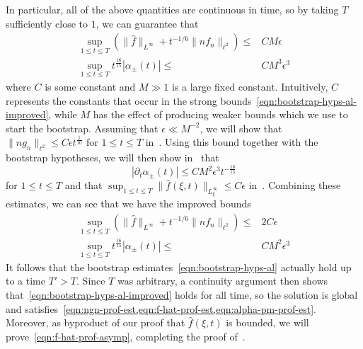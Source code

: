 \documentclass[letterpaper, reqno,final]{amsart}
\begin{document}
In particular, all of the above quantities are continuous in time, so by taking $T$ sufficiently close to $1$, we can guarantee that
\begin{equation}\label{eqn:bootstrap-hyps-al}\begin{split}
    \sup_{1 \leq t \leq T} \left( \lVert \hat{f} \rVert_{L^\infty} + t^{-1/6} \lVert n f_n \rVert_{\ell^2} \right) \leq& CM\epsilon\\
    \sup_{1 \leq t \leq T} t^{\frac{16}{15}}|\alpha_{\pm}(t)| \leq& CM^3 \epsilon^3 
\end{split}
\end{equation}
where $C$ is some constant and $M \gg 1$ is a large fixed constant.  Intuitively, $C$ represents the constants that occur in the strong bounds~\eqref{eqn:bootstrap-hyps-al-improved}, while $M$ has the effect of producing weaker bounds which we use to start the bootstrap.  Assuming that $\epsilon \ll M^{-2}$, we will show that $\lVert n g_n \rVert_{\ell^2} \leq C \epsilon t^{\frac{1}{10}}$ for $1 \leq t \leq T$ in~.  Using this bound together with the bootstrap hypotheses, we will then show in~ that
\begin{equation*}
    |\partial_t \alpha_\pm(t)| \leq CM^2 \epsilon^3 t^{-\frac{16}{15}}
\end{equation*}
for $1 \leq t \leq T$ and that $\sup_{1 \leq t \leq T}\lVert \hat{f}(\xi,t) \rVert_{L^\infty_\xi} \leq C\epsilon$ in~.  Combining these estimates, we can see that we have the improved bounds
\begin{equation}\label{eqn:bootstrap-hyps-al-improved}\begin{split}
    \sup_{1 \leq t \leq T} \left( \lVert \hat{f} \rVert_{L^\infty} + t^{-1/6} \lVert n f_n \rVert_{\ell^2} \right) \leq& 2C\epsilon\\
    \sup_{1 \leq t \leq T} t^{\frac{16}{15}} |\alpha_{\pm}(t)| \leq& CM^2 \epsilon^3 
\end{split}
\end{equation}
It follows that the bootstrap estimates~\eqref{eqn:bootstrap-hyps-al} actually hold up to a time $T' > T$.  Since $T$ was arbitrary, a continuity argument then shows that~\eqref{eqn:bootstrap-hyps-al-improved} holds for all time, so the solution is global and satisfies~\cref{eqn:ngn-prof-est,eqn:f-hat-prof-est,eqn:alpha-pm-prof-est}.  Moreover, as byproduct of our proof that $\hat{f}(\xi,t)$ is bounded, we will prove~\eqref{eqn:f-hat-prof-asymp}, completing the proof of~.
\end{document}
